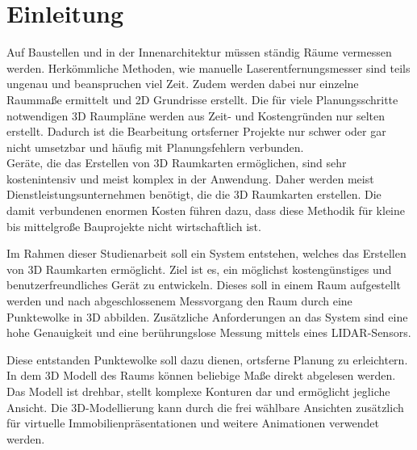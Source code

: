 \chapter{Einleitung}\label{chap:einleitung}


Auf Baustellen und in der Innenarchitektur müssen ständig Räume vermessen werden. Herkömmliche Methoden, wie manuelle Laserentfernungsmesser sind teils ungenau und beanspruchen viel Zeit. Zudem werden dabei nur einzelne Raummaße ermittelt und 2D Grundrisse erstellt. Die für viele Planungsschritte notwendigen 3D Raumpläne werden aus Zeit- und Kostengründen nur selten erstellt. Dadurch ist die Bearbeitung ortsferner Projekte nur schwer oder gar nicht umsetzbar und häufig mit Planungsfehlern verbunden. \\
Geräte, die das Erstellen von 3D Raumkarten ermöglichen, sind sehr kostenintensiv und meist komplex in der Anwendung. Daher werden meist Dienstleistungsunternehmen benötigt, die die 3D Raumkarten erstellen. Die damit verbundenen enormen Kosten führen dazu, dass diese Methodik für kleine bis mittelgroße Bauprojekte nicht wirtschaftlich ist.

Im Rahmen dieser Studienarbeit soll ein System entstehen, welches das Erstellen von 3D Raumkarten ermöglicht. Ziel ist es, ein möglichst kostengünstiges und benutzerfreundliches Gerät zu entwickeln. Dieses soll in einem Raum aufgestellt werden und nach abgeschlossenem Messvorgang den Raum durch eine Punktewolke in 3D abbilden. Zusätzliche Anforderungen an das System sind eine hohe Genauigkeit und eine berührungslose Messung mittels eines \ac{LIDAR}-Sensors.


Diese entstanden Punktewolke soll dazu dienen, ortsferne Planung zu erleichtern. In dem 3D Modell des Raums können beliebige Maße direkt abgelesen werden. Das Modell ist drehbar, stellt komplexe Konturen dar und ermöglicht jegliche Ansicht.
Die 3D-Modellierung kann durch die frei wählbare Ansichten zusätzlich für virtuelle Immobilienpräsentationen und weitere Animationen verwendet werden.      


